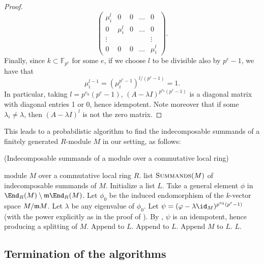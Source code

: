 \documentclass[12pt]{article}
\def\FF{\mathbb F}
\theoremstyle{theorem}
\numberwithin{thm}{section}
\theoremstyle{definition}
\begin{document}
\begin{proof}
  \[ \begin{pmatrix}
    \mu_i^l & 0 & 0 & \dots & 0 \\
    0 & \mu_i^l & 0 & \dots & 0 \\
    \vdots & & & & \vdots \\
    0 & 0 & 0 & \dots & \mu_i^l
  \end{pmatrix}. \]
  Finally, since $k\subset \FF_{p^e}$ for some $e$, if we choose $l$ to be divisible also by $p^e-1$, we have that $$\mu_i^{l-1} = (\mu_i^{p^{e}-1})^{l/(p^{e}-1)} =1.$$
  In particular, taking $l=p^{e_0}(p^e-1)$,
  $(A-\lambda I)^{p^{e_0}(p^e-1)}$ is a diagonal matrix with diagonal entries 1 or 0, hence idempotent. Note moreover that if some $\lambda_i\neq \lambda$, then $(A-\lambda I)^l$ is not the zero matrix.
\end{proof}


This leads to a probabilistic algorithm to find the indecomposable summands of a finitely generated $R$-module $M$ in our setting, as follows:

\begin{algorithm}[H]
  \caption{(Indecomposable summands of a module over a commutative local ring)}\label{alg:local}
  \begin{algorithmic}[1]
    \smallskip
    \Require module $M$ over a commutative local ring $R$.
    \Ensure  list $\textproc{Summands}(M)$ of indecomposable summands of $M$.
    \State Initialize a list $L$.
    \State Take a general element $\phi$ in $\End_R(M) \setminus \m \End_R(M)$.
    \State Let $\phi_0$ be the induced endomorphism of the $k$-vector space $M/\mathfrak m M$.
    \State Let $\lambda$ be any eigenvalue of $\phi_0$.
    \State Let $\psi = (\phi - \lambda \id_M)^{p^{e_0} (p^{e} - 1)}$
    (with the power explicitly as in the proof of ).
    \State By , $\psi$ is an idempotent, hence producing a splitting of $M$.
      \State Append  to $L$.
      \State Append  to $L$.
    \Else
      \State Append $M$ to $L$.
    \EndIf
    \State \Return $L$.
  \end{algorithmic}
\end{algorithm}

\subsection{Termination of the algorithms}
\end{document}
